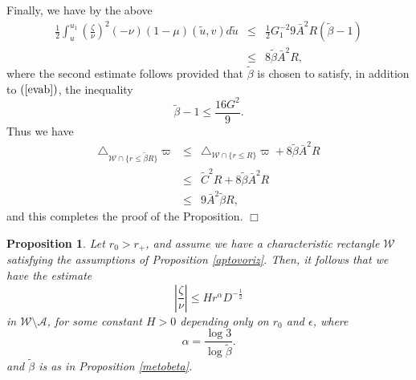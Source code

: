 \documentclass{article}
\newtheorem{proposition}{Proposition}[section]
\newcommand{\zn}{\frac{\zeta}{\nu}}
\begin{document}
Finally, we have by
the above
\begin{eqnarray*}
\frac12\int_{u}^{u_1}{\left(\zn\right)^2(-\nu)(1-\mu)(\tilde{u},v)d\tilde{u}}&\le&
		\frac12G_1^{-2}9 {\bar{A}}^2R(\tilde{\beta}-1)\\
	&\le&	8\tilde{\beta}\bar{A}^2R,
\end{eqnarray*}
where the second estimate follows provided that $\tilde{\beta}$ is chosen to satisfy,
in addition to $(\ref{evab})$, the inequality
\[
\tilde{\beta}-1\le\frac{16G^2}{9}.
\]
Thus we have
\begin{eqnarray*}
\triangle_{\mathcal{W}\cap\{r\le \tilde{\beta}R\}}\varpi
					&\le&	\triangle_{\mathcal{W}\cap\{r\le 
					  R\}}\varpi+8\tilde{\beta}\bar{A}^2R\\
					&\le&	\tilde{C}^2R+
								8\tilde{\beta}\bar{A}^2R\\
							&\le&	9\bar{A}^2\tilde{\beta}R,
\end{eqnarray*}
and this completes the proof of the Proposition. $\Box$

\begin{proposition}
\label{sautatelos}
Let $r_0>r_+$, and assume we have a characteristic rectangle
$\mathcal{W}$ satisfying the assumptions 
of Proposition \ref{aptovoriz}.
Then, it follows that we have the estimate
\begin{equation}
\label{|||}
\left|\zn\right|\le Hr^\alpha D^{-\frac 12}
\end{equation}
in $\mathcal{W}\setminus{\mathcal{A}}$,
for some constant $H>0$ depending only on $r_0$ and $\epsilon$,
where
\[
\alpha=\frac{\log3}{\log{\tilde{\beta}}}.
\]
and $\tilde{\beta}$ is as in Proposition \ref{metobeta}.
\end{proposition}
\end{document}
